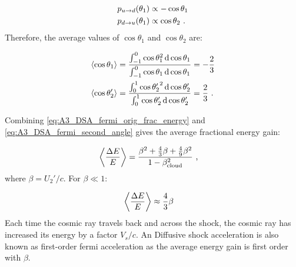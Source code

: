 \begin{equation}
    \begin{aligned}
        p_{u\rightarrow d}\qty(\theta_1)&\propto -\cos\theta_1 \\
        p_{d\rightarrow u}\qty(\theta_1)&\propto \cos\theta_2  \text{ .}
    \end{aligned}
\end{equation}
\noindent Therefore, the average values of $\cos\theta_1$ and $\cos\theta_2$ are:

\begin{equation}
    \begin{aligned}
    \left\langle \cos\theta_1 \right\rangle&=\frac{\int_{-1}^{0} \cos\theta_1^2\dd{\cos\theta_1}}{\int_{-1}^{0}\cos\theta_1 \dd{\cos\theta_1}}=-\frac{2}{3} \\
    \left\langle \cos\theta_2' \right\rangle&=\frac{\int_{0}^{1} {\cos\theta_2'}^2\dd{\cos\theta_2'}}{\int_{0}^{1}\cos\theta_2' \dd{\cos\theta_2'}}=\frac{2}{3}\text{ .}
    \end{aligned} \label{eq:A3_DSA_fermi_second_angle}
\end{equation}

\noindent Combining \autoref{eq:A3_DSA_fermi_orig_frac_energy} and \autoref{eq:A3_DSA_fermi_second_angle} gives the average fractional energy gain:

\begin{equation}
    \begin{aligned}
    \left\langle \frac{\Delta E}{E} \right\rangle
	&=\frac{\beta^2+\frac{4}{3}\beta+\frac{4}{9}\beta^2}{1-\beta_\text{cloud}^2}\text{ ,}
    \end{aligned} 
\end{equation}
\noindent where $\beta=U_2'/c$. For $\beta\ll 1$:

\begin{equation}
    \begin{aligned}
    \left\langle \frac{\Delta E}{E} \right\rangle
	&\approx \frac{4}{3}\beta 
    \end{aligned} 
\end{equation}
\noindent Each time the cosmic ray travels back and across the shock, the cosmic ray has increased its energy by a factor $V_s/c$. An Diffusive shock acceleration is also known as first-order fermi acceleration as the average energy gain is first order with $\beta$. 